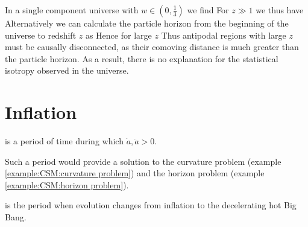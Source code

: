 \documentclass{article}
\begin{document}
\begin{example}\label{example:CSM:horizon problem}
In a single component universe with $w\in(0,\frac{1}{3})$ we find 
For $z\gg1$ we thus have 
Alternatively we can calculate the particle horizon from the beginning of the universe to redshift $z$ as 
Hence for large $z$
Thus antipodal regions with large $z$ must be causally disconnected, as their comoving distance is much greater than the particle horizon. As a result, there is no explanation for the statistical isotropy observed in the universe. 
\end{example}

\section{Inflation}

\begin{definition}[Inflation]
 is a period of time during which $\dot{a},\ddot{a} > 0$. 
\end{definition}

Such a period would provide a solution to the curvature problem (example \ref{example:CSM:curvature problem}) and the horizon problem (example \ref{example:CSM:horizon problem}). 

\begin{definition}[Reheating]
 is the period when evolution changes from inflation to the decelerating hot Big Bang. 
\end{definition}
\end{document}
